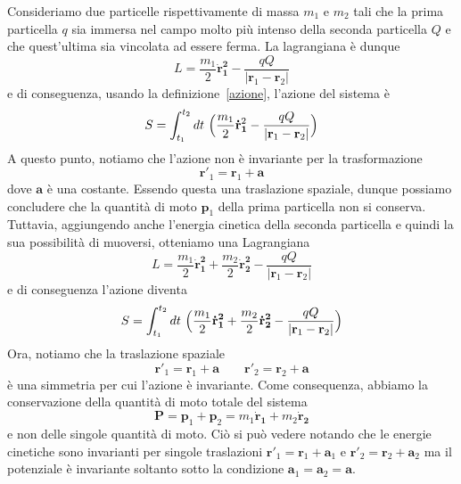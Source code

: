\begin{example} 
    Consideriamo due particelle rispettivamente di massa $m_1$ e $m_2$ tali che la prima particella $q$ sia immersa nel campo molto più intenso della seconda particella $Q$ e che quest'ultima sia vincolata ad essere ferma. La lagrangiana è dunque 
\begin{equation}
    L = \frac{m_1}{2} \mathbf{\dot r_1^2} - \frac{qQ}{|\mathbf r_1 - \mathbf r_2|}
\end{equation}
    e di conseguenza, usando la definizione~\eqref{azione}, l'azione del sistema è
\begin{equation}
    S = \int_{t_1}^{t_2}dt~ \Big( \frac{m_1}{2} \mathbf{\dot r_1}^2- \frac{qQ}{|\mathbf r_1 - \mathbf r_2|} \Big)
\end{equation}
    A questo punto, notiamo che l'azione non è invariante per la trasformazione 
\begin{equation}
    \mathbf r'_1 = \mathbf r_1 + \mathbf a
\end{equation}
    dove $\mathbf a$ è una costante. Essendo questa una traslazione spaziale, dunque possiamo concludere che la quantità di moto $\mathbf p_1$ della prima particella non si conserva. Tuttavia, aggiungendo anche l'energia cinetica della seconda particella e quindi la sua possibilità di muoversi, otteniamo una Lagrangiana  
\begin{equation}
    L = \frac{m_1}{2} \mathbf{\dot r_1^2} + \frac{m_2}{2} \mathbf{\dot r_2^2} - \frac{qQ}{|\mathbf r_1 - \mathbf r_2|}
\end{equation}
    e di conseguenza l'azione diventa
\begin{equation}
    S = \int_{t_1}^{t_2}dt~ \Big( \frac{m_1}{2} \mathbf{\dot r_1^2} + \frac{m_2}{2} \mathbf{\dot r_2^2} - \frac{qQ}{|\mathbf r_1 - \mathbf r_2|} \Big)
\end{equation}
    Ora, notiamo che la traslazione spaziale 
\begin{equation}
    \mathbf r'_1 = \mathbf r_1 + \mathbf a \qquad \mathbf r'_2 = \mathbf r_2 + \mathbf a
\end{equation}
    è una simmetria per cui l'azione è invariante. Come consequenza, abbiamo la conservazione della quantità di moto totale del sistema
\begin{equation*}
    \mathbf P = \mathbf p_1 + \mathbf p_2 = m_1 \mathbf{\dot r_1} + m_2 \mathbf{\dot r_2}
\end{equation*}
    e non delle singole quantità di moto. Ciò si può vedere notando che le energie cinetiche sono invarianti per singole traslazioni $\mathbf r'_1 = \mathbf r_1 + \mathbf a_1$ e $\mathbf r'_2 = \mathbf r_2 + \mathbf a_2$ ma il potenziale è invariante soltanto sotto la condizione $\mathbf a_1 = \mathbf a_2 = \mathbf a$.
\end{example}

